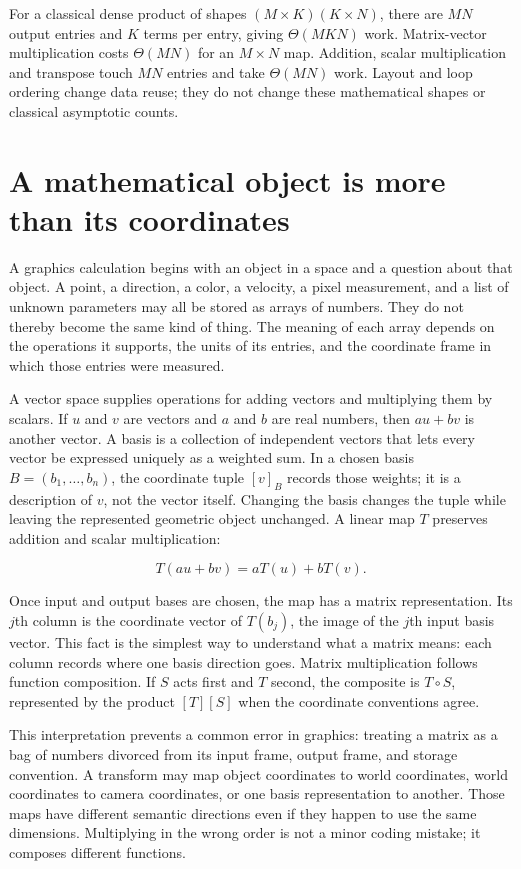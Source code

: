 For a classical dense product of shapes \((M\times K)(K\times N)\), there are \(MN\) output entries and \(K\) terms per entry, giving \(\Theta(MKN)\) work. Matrix-vector multiplication costs \(\Theta(MN)\) for an \(M\times N\) map. Addition, scalar multiplication and transpose touch \(MN\) entries and take \(\Theta(MN)\) work. Layout and loop ordering change data reuse; they do not change these mathematical shapes or classical asymptotic counts.

\section{A mathematical object is more than its coordinates}\label{01-foundations-i-ch018-a-mathematical-object-is-more-than-its-coordinates}

A graphics calculation begins with an object in a space and a question about that object. A point, a direction, a color, a velocity, a pixel measurement, and a list of unknown parameters may all be stored as arrays of numbers. They do not thereby become the same kind of thing. The meaning of each array depends on the operations it supports, the units of its entries, and the coordinate frame in which those entries were measured.

A vector space supplies operations for adding vectors and multiplying them by scalars. If \(u\) and \(v\) are vectors and \(a\) and \(b\) are real numbers, then \(au+bv\) is another vector. A basis is a collection of independent vectors that lets every vector be expressed uniquely as a weighted sum. In a chosen basis \(B=(b_1,\ldots,b_n)\), the coordinate tuple \([v]_B\) records those weights; it is a description of \(v\), not the vector itself. Changing the basis changes the tuple while leaving the represented geometric object unchanged. A linear map \(T\) preserves addition and scalar multiplication:

\[
T(au+bv)=aT(u)+bT(v).
\]

Once input and output bases are chosen, the map has a matrix representation. Its \(j\)th column is the coordinate vector of \(T(b_j)\), the image of the \(j\)th input basis vector. This fact is the simplest way to understand what a matrix means: each column records where one basis direction goes. Matrix multiplication follows function composition. If \(S\) acts first and \(T\) second, the composite is \(T\circ S\), represented by the product \([T][S]\) when the coordinate conventions agree.

This interpretation prevents a common error in graphics: treating a matrix as a bag of numbers divorced from its input frame, output frame, and storage convention. A transform may map object coordinates to world coordinates, world coordinates to camera coordinates, or one basis representation to another. Those maps have different semantic directions even if they happen to use the same dimensions. Multiplying in the wrong order is not a minor coding mistake; it composes different functions.

